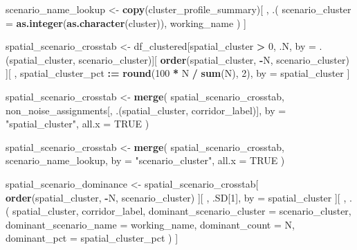 \documentclass[
]{article}
\newenvironment{Shaded}{\begin{snugshade}}{\end{snugshade}}
\newcommand{\AttributeTok}[1]{\textcolor[rgb]{0.13,0.29,0.53}{#1}}
\newcommand{\ConstantTok}[1]{\textcolor[rgb]{0.56,0.35,0.01}{#1}}
\newcommand{\DecValTok}[1]{\textcolor[rgb]{0.00,0.00,0.81}{#1}}
\newcommand{\FunctionTok}[1]{\textcolor[rgb]{0.13,0.29,0.53}{\textbf{#1}}}
\newcommand{\NormalTok}[1]{#1}
\newcommand{\OtherTok}[1]{\textcolor[rgb]{0.56,0.35,0.01}{#1}}
\newcommand{\SpecialCharTok}[1]{\textcolor[rgb]{0.81,0.36,0.00}{\textbf{#1}}}
\newcommand{\StringTok}[1]{\textcolor[rgb]{0.31,0.60,0.02}{#1}}
\begin{document}
\begin{Shaded}
\begin{Highlighting}[]
\NormalTok{scenario\_name\_lookup }\OtherTok{\textless{}{-}} \FunctionTok{copy}\NormalTok{(cluster\_profile\_summary)[}
\NormalTok{  , .(}
    \AttributeTok{scenario\_cluster =} \FunctionTok{as.integer}\NormalTok{(}\FunctionTok{as.character}\NormalTok{(cluster)),}
\NormalTok{    working\_name}
\NormalTok{  )}
\NormalTok{]}

\NormalTok{spatial\_scenario\_crosstab }\OtherTok{\textless{}{-}}\NormalTok{ df\_clustered[spatial\_cluster }\SpecialCharTok{\textgreater{}} \DecValTok{0}\NormalTok{, .N, by }\OtherTok{=}\NormalTok{ .(spatial\_cluster, scenario\_cluster)][}
  \FunctionTok{order}\NormalTok{(spatial\_cluster, }\SpecialCharTok{{-}}\NormalTok{N, scenario\_cluster)}
\NormalTok{][}
\NormalTok{  , spatial\_cluster\_pct }\SpecialCharTok{:=} \FunctionTok{round}\NormalTok{(}\DecValTok{100} \SpecialCharTok{*}\NormalTok{ N }\SpecialCharTok{/} \FunctionTok{sum}\NormalTok{(N), }\DecValTok{2}\NormalTok{), by }\OtherTok{=}\NormalTok{ spatial\_cluster}
\NormalTok{]}

\NormalTok{spatial\_scenario\_crosstab }\OtherTok{\textless{}{-}} \FunctionTok{merge}\NormalTok{(}
\NormalTok{  spatial\_scenario\_crosstab,}
\NormalTok{  non\_noise\_assignments[, .(spatial\_cluster, corridor\_label)],}
  \AttributeTok{by =} \StringTok{"spatial\_cluster"}\NormalTok{,}
  \AttributeTok{all.x =} \ConstantTok{TRUE}
\NormalTok{)}

\NormalTok{spatial\_scenario\_crosstab }\OtherTok{\textless{}{-}} \FunctionTok{merge}\NormalTok{(}
\NormalTok{  spatial\_scenario\_crosstab,}
\NormalTok{  scenario\_name\_lookup,}
  \AttributeTok{by =} \StringTok{"scenario\_cluster"}\NormalTok{,}
  \AttributeTok{all.x =} \ConstantTok{TRUE}
\NormalTok{)}

\NormalTok{spatial\_scenario\_dominance }\OtherTok{\textless{}{-}}\NormalTok{ spatial\_scenario\_crosstab[}
  \FunctionTok{order}\NormalTok{(spatial\_cluster, }\SpecialCharTok{{-}}\NormalTok{N, scenario\_cluster)}
\NormalTok{][}
\NormalTok{  , .SD[}\DecValTok{1}\NormalTok{], by }\OtherTok{=}\NormalTok{ spatial\_cluster}
\NormalTok{][}
\NormalTok{  , .(}
\NormalTok{    spatial\_cluster,}
\NormalTok{    corridor\_label,}
    \AttributeTok{dominant\_scenario\_cluster =}\NormalTok{ scenario\_cluster,}
    \AttributeTok{dominant\_scenario\_name =}\NormalTok{ working\_name,}
    \AttributeTok{dominant\_count =}\NormalTok{ N,}
    \AttributeTok{dominant\_pct =}\NormalTok{ spatial\_cluster\_pct}
\NormalTok{  )}
\NormalTok{]}


\end{Highlighting}
\end{Shaded}
\end{document}
